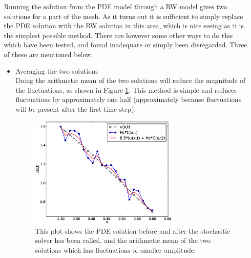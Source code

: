 Running the solution from the PDE model through a RW model gives two solutions for a part of the mesh. 
As it turns out it is sufficient to simply replace the PDE solution with the RW solution in this area, which is nice seeing as it is the simplest possible method. 
There are however some other ways to do this which have been tested, and found inadequate or simply been disregarded. Three of these are mentioned below. 
\begin{itemize}
 \item Averaging the two solutions \\
 Doing the arithmetic mean of the two solutions will reduce the magnitude of the fluctuations, as shown in Figure \ref{theory:average}. 
 This method is simple and reduces fluctuations by approximately one half (approximately because fluctuations will be present after the first time step). 
 \begin{figure}[h]
  \centering
  \includegraphics[width=0.7\textwidth]{Figures/average.eps}
  \caption[Idea behind averaging solutions]{This plot shows the PDE solution before and after the stochastic solver has been called, and the arithmetic mean of the two solutions which has fluctuations of smaller amplitude.}
  \label{theory:average}
 \end{figure}


\end{itemize}
